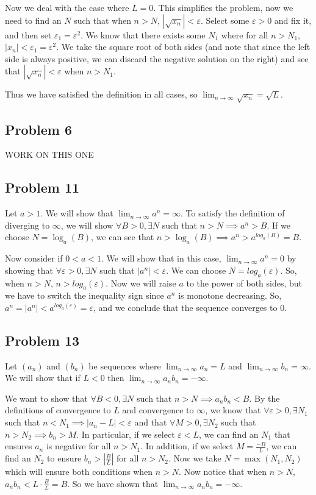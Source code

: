 \documentclass[11pt]{article}
\begin{document}
Now we deal with the case where $L=0$. This simplifies the problem, now
we need to find an $N$ such that when $n > N$, $\left|\sqrt{x_n}\right|< \varepsilon$.
Select some $\varepsilon > 0$ and fix it, and then set $\varepsilon_1 = \varepsilon^2$.
We know that there exists some $N_1$ where for all $n > N_1$,
$|x_n| < \varepsilon_1 = \varepsilon^2$. We take the square root of both sides (and
note that since the left side is always positive, we can discard the negative 
solution on the right)
and see that $\left| \sqrt{x_n} \right| < \varepsilon$ when $n > N_1$. 

Thus we have satisfied the definition
in all cases, so $\lim_{n\to\infty} \sqrt{x_n} = \sqrt{L}$.

\subsection*{Problem 6}
WORK ON THIS ONE 
\subsection*{Problem 11}
Let $a>1$. We will show that $\lim_{n\to\infty}a^n=\infty$.
To satisfy the definition of diverging to $\infty$, we will show
$\forall B > 0, \exists N$ such that $n > N \implies a^n > B$. 
If we choose $N = \log_a(B)$, we can see that 
$n > \log_a(B) \implies a^n > a^{log_a(B)} = B$.

Now consider if $0<a<1$. We will show that in this case, $\lim_{n\to\infty}a^n=0$
by showing that $\forall \varepsilon > 0, \exists N$ such that
$\left| a^n \right| < \varepsilon$. We can choose $N = log_a(\varepsilon)$.
So, when $n > N$, $n > log_a(\varepsilon)$. Now we will raise $a$ to the power 
of both sides, but we have to switch the inequality sign since $a^n$ is monotone
decreasing. So, $a^n = |a^n| < a^{log_a(\varepsilon)} = \varepsilon$, and we
conclude that the sequence converges to 0.

\subsection*{Problem 13}
Let $(a_n)$ and $(b_n)$ be sequences where $\lim_{n\to\infty}a_n=L$ and 
$\lim_{n\to\infty}b_n=\infty$. We will show that if $L < 0$ then
$\lim_{n\to\infty}a_nb_n=-\infty$.

We want to show that $\forall B<0, \exists N$ such that
$n > N \implies a_nb_n < B$. 
By the definitions of convergence to $L$ and convergence to $\infty$, we know
that $\forall \varepsilon>0, \exists N_1$ such that $n<N_1 \implies 
|a_n-L|<\varepsilon$ and that $\forall M>0, \exists N_2$ such that
$n > N_2 \implies b_n > M$. In particular, if we select $\varepsilon < L$, we can
find an $N_1$ that ensures $a_n$ is negative for all $n > N_1$.
In addition, if we select $M = \frac{-B}{L}$, we can find an
$N_2$ to ensure $b_n > \left|\frac{B}{L}\right|$ for all $n > N_2$. 
Now we take $N = \max(N_1, N_2)$ which will ensure both conditions
when $n > N$. Now notice that when $n > N$, $a_nb_n < L\cdot\frac{B}{L} = B$. 
So we have shown that $\lim_{n\to\infty}a_nb_n=-\infty$.
\end{document}
